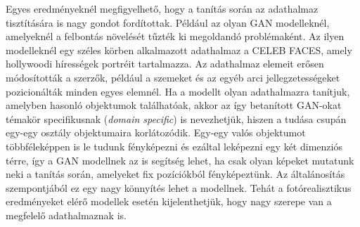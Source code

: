 Egyes eredményeknél megfigyelhető, hogy a tanítás során az adathalmaz tisztítására is nagy gondot fordítottak. Például az olyan GAN modelleknél, amelyeknél a felbontás növelését tűzték ki megoldandó problémaként. Az ilyen modelleknél egy széles körben alkalmazott adathalmaz a CELEB FACES, amely hollywoodi hírességek portréit tartalmazza. Az adathalmaz elemeit erősen módosították a szerzők, például a szemeket és az egyéb arci jellegzetességeket pozicionálták minden egyes elemnél.
Ha a modellt olyan adathalmazra tanítjuk, amelyben hasonló objektumok találhatóak, akkor az így betanított GAN-okat témakör specifikusnak (\textit{domain specific}) is nevezhetjük, hiszen a tudása csupán egy-egy osztály objektumaira korlátozódik. Egy-egy valós objektumot többféleképpen is le tudunk fényképezni és ezáltal leképezni egy két dimenziós térre, így a GAN modellnek az is segítség lehet, ha csak olyan képeket mutatunk neki a tanítás során, amelyeket fix pozíciókból fényképeztünk. Az általánosítás szempontjából ez egy nagy könnyítés lehet a modellnek.
Tehát a fotórealisztikus eredményeket elérő modellek esetén kijelenthetjük, hogy nagy szerepe van a megfelelő adathalmaznak is.

